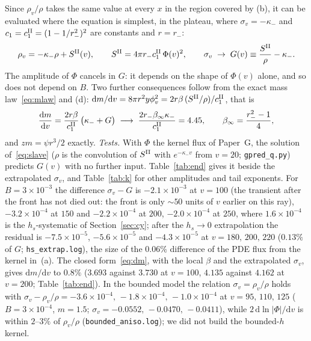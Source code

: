 \documentclass[11pt]{article}
\begin{document}
Since $\rho_v/\rho$ takes the same value at every $x$ in the region covered by (b), it can be evaluated where the equation is simplest, in the plateau, where $\sigma_v=-\kappa_-$ and $c_1=c_1^{\rm II}=(1-1/r_-^{2})^{2}$ are constants and $r=r_-$:
\begin{equation}
\rho_v=-\kappa_-\rho+S^{\rm II}(v),\qquad S^{\rm II}=4\pi r_-c_1^{\rm II}\,\Phi(v)^{2},\qquad \sigma_v\;\to\;G(v)\equiv\frac{S^{\rm II}}{\rho}-\kappa_-.
\label{eq:slave}
\end{equation}
The amplitude of $\Phi$ cancels in $G$: it depends on the shape of $\Phi(v)$ alone, and so does not depend on $B$. Two further consequences follow from the exact mass law~\eqref{eq:mlaw} and (d): $\mathrm{d}m/\mathrm{d}v=8\pi r^{2}y\phi_v^{2}=2r\beta\,(S^{\rm II}/\rho)/c_1^{\rm II}$, that is
\begin{equation}
\frac{\mathrm{d}m}{\mathrm{d}v}=\frac{2r\beta}{c_1^{\rm II}}\,\bigl(\kappa_-+G\bigr)\;\longrightarrow\;\frac{2r_-\beta_\infty\kappa_-}{c_1^{\rm II}}=4.45,\qquad \beta_\infty=\frac{r_-^{2}-1}{4},
\label{eq:dm}
\end{equation}
and $zm=\psi r^{3}/2$ exactly. \emph{Tests.} With $\Phi$ the kernel flux of Paper~G, the solution of~\eqref{eq:slave} ($\rho$ is the convolution of $S^{\rm II}$ with $e^{-\kappa_-v}$ from $v=20$; \texttt{gpred\_q.py}) predicts $G(v)$ with no further input. Table~\ref{tab:end} gives it beside the extrapolated $\sigma_v$, and Table~\ref{tab:k} for other amplitudes and tail exponents. For $B=3\times10^{-3}$ the difference $\sigma_v-G$ is $-2.1\times10^{-3}$ at $v=100$ (the transient after the front has not died out: the front is only $\sim50$ units of $v$ earlier on this ray), $-3.2\times10^{-4}$ at $150$ and $-2.2\times10^{-4}$ at $200$, $-2.0\times10^{-4}$ at $250$, where $1.6\times10^{-4}$ is the $h_s$-systematic of Section~\ref{sec:cy}; after the $h_s\to0$ extrapolation the residual is $-7.5\times10^{-5}$, $-5.6\times10^{-5}$ and $-4.3\times10^{-5}$ at $v=180,\,200,\,220$ ($0.13\%$ of $G$; \texttt{hs\_extrap.log}), the size of the $0.06\%$ difference of the PDE flux from the kernel in~(a). The closed form~\eqref{eq:dm}, with the local $\beta$ and the extrapolated $\sigma_v$, gives $\mathrm{d}m/\mathrm{d}v$ to $0.8\%$ ($3.693$ against $3.730$ at $v=100$, $4.135$ against $4.162$ at $v=200$; Table~\ref{tab:end}). In the bounded model the relation $\sigma_v=\rho_v/\rho$ holds with $\sigma_v-\rho_v/\rho=-3.6\times10^{-4},\,-1.8\times10^{-4},\,-1.0\times10^{-4}$ at $v=95,\,110,\,125$ ($B=3\times10^{-4}$, $m=1.5$; $\sigma_v=-0.0552,\,-0.0470,\,-0.0411$), while $2\,\mathrm{d}\ln|\Phi|/\mathrm{d}v$ is within $2$--$3\%$ of $\rho_v/\rho$ (\texttt{bounded\_aniso.log}); we did not build the bounded-$h$ kernel.
\end{document}
